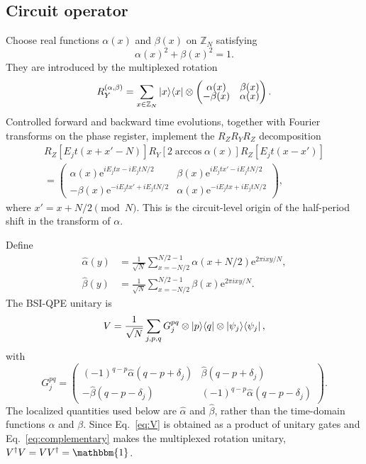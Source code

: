 \documentclass[aps,floatfix,10pt,amssymb,amsmath,superscriptaddress,nofootinbib,longbibliography,nobalancelastpage,twocolumn]{revtex4-2}
\newcommand{\id}{\mathbbm{1}}
\newcommand{\e}{\mathrm{e}}
\newcommand{\ketbra}[2]{\ket{#1}\!\bra{#2}}
\begin{document}
\subsection{Circuit operator}

Choose real functions $\alpha(x)$ and $\beta(x)$ on $\mathbb Z_N$ satisfying
\begin{equation}
 \alpha(x)^2+\beta(x)^2=1.
 \label{eq:complementary}
\end{equation}
They are introduced by the multiplexed rotation
\begin{equation}
 R_Y^{(\alpha,\beta)}
 =\sum_{x\in\mathbb Z_N}\ketbra{x}{x}\otimes
 \begin{pmatrix}
 \alpha(x)&\beta(x)\\[-1mm]
 -\beta(x)&\alpha(x)
 \end{pmatrix}.
 \label{eq:cry}
\end{equation}
Controlled forward and backward time evolutions, together with Fourier transforms on the phase register, implement the $R_ZR_YR_Z$ decomposition
\begin{multline}
R_Z[E_jt(x+x'-N)]R_Y[2\arccos\alpha(x)]R_Z[E_jt(x-x')]\\
=\begin{pmatrix}
\alpha(x)\e^{iE_jtx-iE_jtN/2}&
\beta(x)\e^{iE_jtx'-iE_jtN/2}\\
-\beta(x)\e^{-iE_jtx'+iE_jtN/2}&
\alpha(x)\e^{-iE_jtx+iE_jtN/2}
\end{pmatrix},
\label{eq:euler}
\end{multline}
where $x'=x+N/2\pmod N$.  This is the circuit-level origin of the half-period shift in the transform of $\alpha$.

Define
\begin{align}
 \widehat\alpha(y)&=\frac{1}{\sqrt N}
 \sum_{x=-N/2}^{N/2-1}\alpha(x+N/2)\e^{2\pi ixy/N},\label{eq:alphahat}\\
 \widehat\beta(y)&=\frac{1}{\sqrt N}
 \sum_{x=-N/2}^{N/2-1}\beta(x)\e^{2\pi ixy/N}.
 \label{eq:betahat}
\end{align}
The BSI-QPE unitary is
\begin{equation}
 V=\frac{1}{\sqrt N}\sum_{j,p,q}G_j^{pq}\otimes\ketbra{p}{q}\otimes\ketbra{\psi_j}{\psi_j},
 \label{eq:V}
\end{equation}
with
\begin{equation}
G_j^{pq}=\begin{pmatrix}
(-1)^{q-p}\widehat\alpha(q-p+\delta_j)&
\widehat\beta(q-p+\delta_j)\\
-\widehat\beta(q-p-\delta_j)&
(-1)^{q-p}\widehat\alpha(q-p-\delta_j)
\end{pmatrix}.
\label{eq:G}
\end{equation}
The localized quantities used below are $\widehat\alpha$ and $\widehat\beta$, rather than the time-domain functions $\alpha$ and $\beta$.  Since Eq.~\eqref{eq:V} is obtained as a product of unitary gates and Eq.~\eqref{eq:complementary} makes the multiplexed rotation unitary, $V^\dagger V=VV^\dagger=\id$.
\end{document}
